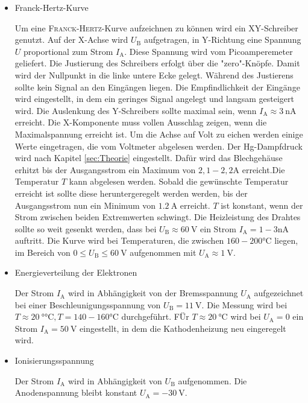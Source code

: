 \begin{itemize}
\item{Franck-Hertz-Kurve}

Um eine \textsc{Franck}-\textsc{Hertz}-Kurve aufzeichnen zu können wird ein XY-Schreiber genutzt. 
Auf der X-Achse wird $U_\mathup{B}$ aufgetragen, in Y-Richtung eine Spannung $U$ proportional zum Strom $I_\mathup{A}$. 
Diese Spannung wird vom Picoamperemeter geliefert.
Die Justierung des Schreibers erfolgt über die "zero"-Knöpfe. Damit wird der Nullpunkt in die linke untere Ecke gelegt.
Während des Justierens sollte kein Signal an den Eingängen liegen.
Die Empfindlichkeit der Eingänge wird eingestellt, in dem ein geringes Signal angelegt und langsam gesteigert wird. 
Die Auslenkung des Y-Schreibers sollte maximal sein, wenn $I_\mathup{A}\approx \SI{3}{\nano\ampere}$ erreicht.
Die X-Komponente muss vollen Ausschlag zeigen, wenn die Maximalspannung erreicht ist.
Um die Achse auf Volt zu eichen werden einige Werte eingetragen, die vom Voltmeter abgelesen werden.
Der Hg-Dampfdruck wird nach Kapitel \ref{sec:Theorie} eingestellt.
Dafür wird das Blechgehäuse erhitzt bis der Ausgangsstrom ein Maximum von ${2,1-2,2}{\si\ampere}$ erreicht.Die Temperatur $T$ kann abgelesen werden. 
Sobald die gewünschte Temperatur erreicht ist sollte diese heruntergeregelt werden werden, bis der Ausgangsstrom nun ein Minimum von $\SI{1,2}{\ampere}$ erreicht. 
$T$ ist konstant, wenn der Strom zwischen beiden Extremwerten schwingt.
Die Heizleistung des Drahtes sollte so weit gesenkt werden, dass bei $U_\mathup{B}\approx \SI{60}{\volt}$ ein Strom $I_\mathup{A}={1-3}{\si{\nano\ampere}}$ auftritt. 
Die Kurve wird bei Temperaturen, die zwischen ${160-200}\si{\celsius}$ liegen, im Bereich von $0\leq U_\mathup{B} \leq \SI{60}{\volt}$ aufgenommen mit $U_\mathup{A}\approx \SI{1}{\volt}$.
\item{Energieverteilung der Elektronen}

Der Strom $I_\mathup{A}$ wird in Abhängigkeit von der Bremsspannung $U_\mathup{A}$ aufgezeichnet bei einer Beschleunigungsspannung von $U_\mathup{B}=\SI{11}{\volt}$. 
Die Messung wird bei $T\approx \SI{20}{\degree\celsius},T={140-160}{\si\celsius}$ durchgeführt.
FÜr $T\approx \SI{20}{\celsius}$ wird bei $U_\mathup{A}=0$ ein Strom $I_\mathup{A}=\SI{50}{\volt}$ eingestellt, in dem die Kathodenheizung neu eingeregelt wird.
\item{Ionisierungsspannung}

Der Strom $I_\mathup{A}$ wird in Abhängigkeit von $U_\mathup{B}$ aufgenommen. Die Anodenspannung bleibt konstant $U_\mathup{A}=\SI{-30}{\volt}$.
\end{itemize}

